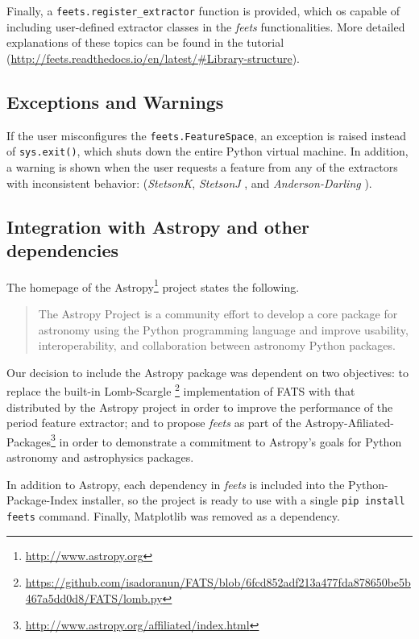 \documentclass[final,5p,times,twocolumn,authoryear]{elsarticle}
\begin{document}
Finally, a \texttt{feets.register\_extractor} function is provided, which os
capable of including user-defined extractor classes in the \textit{feets} functionalities.
More detailed explanations of these topics can be found in the tutorial 
(\url{http://feets.readthedocs.io/en/latest/#Library-structure}).
%
\subsection{Exceptions and Warnings}
%
If the user misconfigures the \texttt{feets.FeatureSpace}, 
an exception is raised instead of \texttt{sys.exit()}, which shuts down 
the entire Python virtual machine. 
In addition, a warning is shown when the user requests a feature from any of the 
extractors with inconsistent behavior: (\textit{StetsonK}, 
\textit{StetsonJ} \citep{richards_machine-learned_2011}, and \textit{Anderson-Darling} \citep{kim_-trending_2009}).	

\subsection{Integration with Astropy and other dependencies}
%
The homepage of the Astropy\footnote{\url{http://www.astropy.org}} 
project \citep{robitaille_astropy:_2013} states the following.
%
\begin{quotation}
The Astropy Project is a community effort to develop a core package for astronomy using the Python 
programming language and improve usability, interoperability, and collaboration between astronomy 
Python packages. 
\end{quotation}
%
Our decision to include the Astropy package 
was dependent on two objectives: to replace the built-in 
Lomb-Scargle
\footnote{\url{https://github.com/isadoranun/FATS/blob/6fcd852adf213a477fda878650be5b467a5dd0d8/FATS/lomb.py}} 
implementation of FATS with
that distributed by the Astropy project in order to improve the performance of the
period feature extractor; and to propose \textit{feets} as part of the 
Astropy-Afiliated-Packages\footnote{\url{http://www.astropy.org/affiliated/index.html}}
in order to demonstrate a commitment to Astropy's goals for Python astronomy and astrophysics packages.

In addition to Astropy, each dependency in \textit{feets} 
is included into the Python-Package-Index installer, so the project is ready to use
with a single \texttt{pip install feets} command.
Finally, Matplotlib was removed as a dependency.
%
\end{document}
